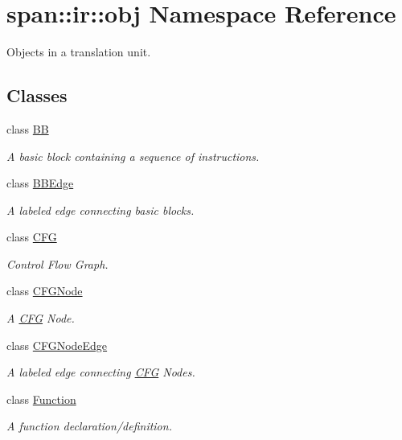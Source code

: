 \hypertarget{namespacespan_1_1ir_1_1obj}{}\section{span\+:\+:ir\+:\+:obj Namespace Reference}
\label{namespacespan_1_1ir_1_1obj}


Objects in a translation unit.  


\subsection*{Classes}
\begin{DoxyCompactItemize}
\item 
class \hyperlink{classspan_1_1ir_1_1obj_1_1BB}{BB}
\begin{DoxyCompactList}\small\item\em A basic block containing a sequence of instructions. \end{DoxyCompactList}\item 
class \hyperlink{classspan_1_1ir_1_1obj_1_1BBEdge}{B\+B\+Edge}
\begin{DoxyCompactList}\small\item\em A labeled edge connecting basic blocks. \end{DoxyCompactList}\item 
class \hyperlink{classspan_1_1ir_1_1obj_1_1CFG}{C\+FG}
\begin{DoxyCompactList}\small\item\em Control Flow Graph. \end{DoxyCompactList}\item 
class \hyperlink{classspan_1_1ir_1_1obj_1_1CFGNode}{C\+F\+G\+Node}
\begin{DoxyCompactList}\small\item\em A \hyperlink{classspan_1_1ir_1_1obj_1_1CFG}{C\+FG} Node. \end{DoxyCompactList}\item 
class \hyperlink{classspan_1_1ir_1_1obj_1_1CFGNodeEdge}{C\+F\+G\+Node\+Edge}
\begin{DoxyCompactList}\small\item\em A labeled edge connecting \hyperlink{classspan_1_1ir_1_1obj_1_1CFG}{C\+FG} Nodes. \end{DoxyCompactList}\item 
class \hyperlink{classspan_1_1ir_1_1obj_1_1Function}{Function}
\begin{DoxyCompactList}\small\item\em A function declaration/definition. \end{DoxyCompactList}\end{DoxyCompactItemize}
